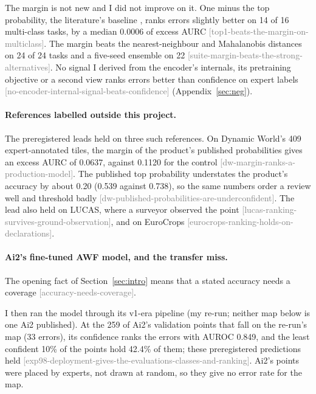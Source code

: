 \documentclass[11pt,a4paper]{article}
\newcommand{\claim}[1]{{\scriptsize\textsf{\textcolor{gray}{[#1]}}}}
\begin{document}
The margin is not new and I did not improve on it. One minus the top probability, the literature's baseline
\citep{hendrycks2017}, ranks errors slightly better on 14 of 16 multi-class tasks, by a median 0.0006 of excess AURC
\claim{top1-beats-the-margin-on-multiclass}. The margin beats the nearest-neighbour \citep{sun2022} and Mahalanobis
\citep{lee2018} distances on 24 of 24 tasks and a five-seed ensemble \citep{lakshminarayanan2017} on 22
\claim{suite-margin-beats-the-strong-alternatives}. No signal I derived from the encoder's internals, its pretraining
objective or a second view ranks errors better than confidence on expert labels
\claim{no-encoder-internal-signal-beats-confidence} (Appendix~\ref{sec:neg}).

\paragraph{References labelled outside this project.}
The preregistered leads held on three such references. On Dynamic World's 409 expert-annotated tiles, the margin of
the product's published probabilities gives an excess AURC of 0.0637, against 0.1120 for the control
\claim{dw-margin-ranks-a-production-model}. The published top probability understates the product's accuracy by
about 0.20 (0.539 against 0.738), so the same numbers order a review well and threshold badly
\claim{dw-published-probabilities-are-underconfident}. The lead also held on LUCAS, where a surveyor observed the
point \claim{lucas-ranking-survives-ground-observation}, and on EuroCrops \claim{eurocrops-ranking-holds-on-declarations}.

\paragraph{Ai2's fine-tuned AWF model, and the transfer miss.}
\label{sec:res-deployed}
The opening fact of Section~\ref{sec:intro} means that a stated accuracy needs a coverage
\claim{accuracy-needs-coverage}.

I then ran the model through its v1-era pipeline (my re-run; neither map below is one Ai2 published). At the 259 of
Ai2's validation points that fall on the re-run's map (33 errors), its confidence ranks the errors with AUROC 0.849,
and the least confident 10\% of the points hold 42.4\% of them; these preregistered predictions held
\claim{exp98-deployment-gives-the-evaluations-classes-and-ranking}. Ai2's points were placed by experts, not drawn at
random, so they give no error rate for the map.
\end{document}
